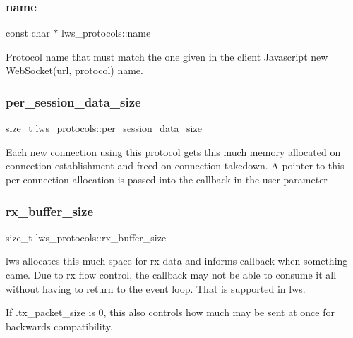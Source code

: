 \subsubsection{\texorpdfstring{name}{name}}
{\footnotesize\ttfamily const char $\ast$ lws\+\_\+protocols\+::name}

Protocol name that must match the one given in the client Javascript new Web\+Socket(url, \textquotesingle{}protocol\textquotesingle{}) name. \mbox{\label{structlws__protocols_a9bbd85f591ffb4259711cb5acbb05bea}} 
\subsubsection{\texorpdfstring{per\+\_\+session\+\_\+data\+\_\+size}{per\_session\_data\_size}}
{\footnotesize\ttfamily size\+\_\+t lws\+\_\+protocols\+::per\+\_\+session\+\_\+data\+\_\+size}

Each new connection using this protocol gets this much memory allocated on connection establishment and freed on connection takedown. A pointer to this per-\/connection allocation is passed into the callback in the \textquotesingle{}user\textquotesingle{} parameter \mbox{\label{structlws__protocols_a0d1d4996d81b2f5e125bcec981e461c5}} 
\subsubsection{\texorpdfstring{rx\+\_\+buffer\+\_\+size}{rx\_buffer\_size}}
{\footnotesize\ttfamily size\+\_\+t lws\+\_\+protocols\+::rx\+\_\+buffer\+\_\+size}

lws allocates this much space for rx data and informs callback when something came. Due to rx flow control, the callback may not be able to consume it all without having to return to the event loop. That is supported in lws.

If .tx\+\_\+packet\+\_\+size is 0, this also controls how much may be sent at once for backwards compatibility.

